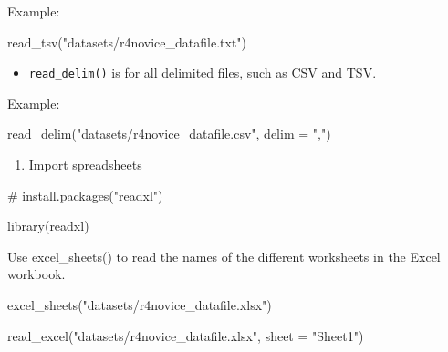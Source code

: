 \documentclass[
  letterpaper,
  DIV=11,
  numbers=noendperiod]{scrreprt}
\newenvironment{Shaded}{}{}
\newcommand{\AttributeTok}[1]{\textcolor[rgb]{0.84,0.23,0.29}{#1}}
\newcommand{\CommentTok}[1]{\textcolor[rgb]{0.42,0.45,0.49}{#1}}
\newcommand{\FunctionTok}[1]{\textcolor[rgb]{0.44,0.26,0.76}{#1}}
\newcommand{\NormalTok}[1]{\textcolor[rgb]{0.14,0.16,0.18}{#1}}
\newcommand{\StringTok}[1]{\textcolor[rgb]{0.01,0.18,0.38}{#1}}
\providecommand{\tightlist}{%
  \setlength{\itemsep}{0pt}\setlength{\parskip}{0pt}}\usepackage{longtable,booktabs,array}
\begin{document}
Example:

\begin{Shaded}
\begin{Highlighting}[]
\FunctionTok{read\_tsv}\NormalTok{(}\StringTok{"datasets/r4novice\_datafile.txt"}\NormalTok{)}
\end{Highlighting}
\end{Shaded}

\begin{itemize}
\tightlist
\item
  \texttt{read\_delim()} is for all delimited files, such as CSV and
  TSV.
\end{itemize}

Example:

\begin{Shaded}
\begin{Highlighting}[]
\FunctionTok{read\_delim}\NormalTok{(}\StringTok{"datasets/r4novice\_datafile.csv"}\NormalTok{, }\AttributeTok{delim =} \StringTok{","}\NormalTok{)}
\end{Highlighting}
\end{Shaded}

\begin{enumerate}
\def\labelenumi{\alph{enumi}.}
\setcounter{enumi}{1}
\tightlist
\item
  Import spreadsheets
\end{enumerate}

\begin{Shaded}
\begin{Highlighting}[]
\CommentTok{\# install.packages("readxl")}
\end{Highlighting}
\end{Shaded}

\begin{Shaded}
\begin{Highlighting}[]
\FunctionTok{library}\NormalTok{(readxl)}
\end{Highlighting}
\end{Shaded}

Use excel\_sheets() to read the names of the different worksheets in the
Excel workbook.

\begin{Shaded}
\begin{Highlighting}[]
\FunctionTok{excel\_sheets}\NormalTok{(}\StringTok{"datasets/r4novice\_datafile.xlsx"}\NormalTok{)}
\end{Highlighting}
\end{Shaded}

\begin{Shaded}
\begin{Highlighting}[]
\FunctionTok{read\_excel}\NormalTok{(}\StringTok{"datasets/r4novice\_datafile.xlsx"}\NormalTok{, }\AttributeTok{sheet =} \StringTok{"Sheet1"}\NormalTok{)}
\end{Highlighting}
\end{Shaded}
\end{document}
